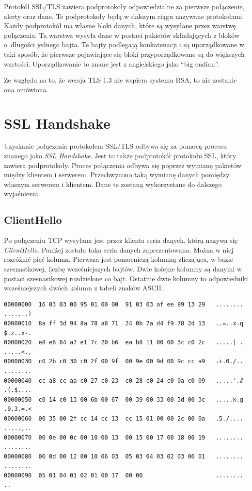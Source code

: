 \documentclass[12pt,twoside,a4]{mwbk}
\theoremstyle{definition}
\begin{document}
Protokół SSL/TLS zawiera podprotokoły odpowiedzialne za pierwsze połączenie, alerty oraz dane. Te podprotokoły będą w dalszym ciągu nazywane protokołami. Każdy podprotokół ma własne bloki danych, które są wysyłane przez warstwę połączenia. Ta warstwa wysyła dane w postaci pakietów składających z bloków o~długości jednego bajta. Te bajty podlegają konkatenacji i są uporządkowane w taki sposób, że pierwsze pojawiające się bloki przyporządkowane są do większych wartości. Uporządkowanie to znane jest z angielskiego jako ``big endian''. \\ \par

Ze względu na to, że wersja TLS 1.3 nie wspiera systemu RSA, to nie zostanie ona omówiona.

\section{SSL Handshake \cite{ssl}}
Uzyskanie połączenia protokołem SSL/TLS odbywa się za pomocą procesu znanego jako \textit{SSL Handshake}. Jest to także podprotokół protokołu SSL, który zawiera podprotokoły. Proces połączenia odbywa się poprzez wymianę pakietów między klientem i serwerem. Przechwycono taką wymianę danych pomiędzy własnym serwerem i klientem. Dane te zostaną wykorzystane do dalszego wyjaśnienia.

\subsection{ClientHello}
Po połączeniu TCP wysyłana jest przez klienta seria danych, którą nazywa się \textit{ClientHello}. Poniżej została taka seria danych zaprezentowana. Można w niej rozróżnić pięć kolumn. Pierwsza jest pomocniczą kolumną zliczająca, w bazie szesnastkowej, liczbę wcześniejszych bajtów. Dwie kolejne kolumny są danymi w postaci szesnastkowej rozdzielone co bajt. Ostatnie dwie kolumny to odpowiedniki wcześniejszych dwóch kolumn z tabeli znaków ASCII.

\begin{lstlisting}[keywordstyle=\color{Black},
  commentstyle=\color{Black},
  stringstyle=\color{Black},
  identifierstyle=\color{Black}]
00000000  16 03 03 00 95 01 00 00  91 03 03 af ee 89 13 29   ........ .......)
00000010  8a ff 3d 94 8a 78 a8 71  24 0b 7a d4 f9 78 2d 13   ..=..x.q $.z..x-.
00000020  e8 e6 84 a7 e1 7c 20 b6  ea b8 11 00 00 3c c0 2c   .....| . .....<.,
00000030  c0 2b c0 30 c0 2f 00 9f  00 9e 00 9d 00 9c cc a9   .+.0./.. ........
00000040  cc a8 cc aa c0 27 c0 23  c0 28 c0 24 c0 0a c0 09   .....'.# .(.$....
00000050  c0 14 c0 13 00 6b 00 67  00 39 00 33 00 3d 00 3c   .....k.g .9.3.=.<
00000060  00 35 00 2f cc 14 cc 13  cc 15 01 00 00 2c 00 0a   .5./.... .....,..
00000070  00 0e 00 0c 00 10 00 13  00 15 00 17 00 18 00 19   ........ ........
00000080  00 0d 00 12 00 10 06 03  05 03 04 03 02 03 06 01   ........ ........
00000090  05 01 04 01 02 01 00 17  00 00                     ........ ..
\end{lstlisting}
\end{document}
